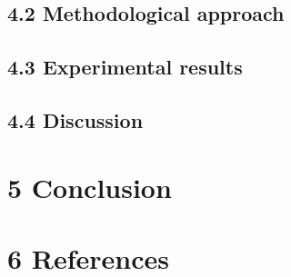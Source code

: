 \documentclass[authoryear,review,3p]{elsarticle}
\begin{document}
\subsection*{4.2 Methodological approach}
\subsection*{4.3 Experimental results}
\subsection*{4.4 Discussion}



\section*{5 Conclusion}



\bigskip
\section*{6 References}



\end{document}
